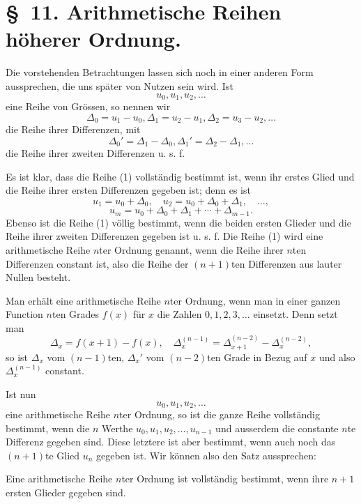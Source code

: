 \documentclass[11pt]{article}
\begin{document}
\section*{\S~11. Arithmetische Reihen höherer Ordnung.}

Die vorstehenden Betrachtungen lassen sich noch in einer anderen Form aussprechen, die uns später von Nutzen sein wird. Ist
\begin{equation}
 u_0,u_1,u_2,\ldots
\tag{1}
\end{equation}
eine Reihe von Grössen, so nennen wir
\begin{equation}
 \Delta_0=u_1-u_0,
 \Delta_1=u_2-u_1,
 \Delta_2=u_3-u_2,\ldots
\tag{2}
\end{equation}
die Reihe ihrer Differenzen, mit
\begin{equation}
 \Delta_0'=\Delta_1-\Delta_0,
 \Delta_1'=\Delta_2-\Delta_1,\ldots
\tag{3}
\end{equation}
die Reihe ihrer zweiten Differenzen u. s. f.

Es ist klar, dass die Reihe (1) vollständig bestimmt ist, wenn ihr erstes Glied und die Reihe ihrer ersten Differenzen gegeben ist; denn es ist
\[
 u_1=u_0+\Delta_0,
 \quad u_2=u_0+\Delta_0+\Delta_1,
 \quad\ldots,
\]
\[
 u_m=u_0+\Delta_0+\Delta_1+\cdots+\Delta_{m-1}.
\]
Ebenso ist die Reihe (1) völlig bestimmt, wenn die beiden ersten Glieder und die Reihe ihrer zweiten Differenzen gegeben ist u. s. f. Die Reihe (1) wird eine arithmetische Reihe $n$ter Ordnung genannt, wenn die Reihe ihrer $n$ten Differenzen constant ist, also die Reihe der $(n+1)$ten Differenzen aus lauter Nullen besteht.

Man erhält eine arithmetische Reihe $n$ter Ordnung, wenn man in einer ganzen Function $n$ten Grades $f(x)$ für $x$ die Zahlen $0,1,2,3,\ldots$ einsetzt. Denn setzt man
\[
 \Delta_x=f(x+1)-f(x),\quad
 \Delta_x^{(n-1)}=\Delta_{x+1}^{(n-2)}-\Delta_x^{(n-2)},
\]
so ist $\Delta_x$ vom $(n-1)$ten, $\Delta_x'$ vom $(n-2)$ten Grade in Bezug auf $x$ und also $\Delta_x^{(n-1)}$ constant.

Ist nun
\[
 u_0,u_1,u_2,\ldots
\]
eine arithmetische Reihe $n$ter Ordnung, so ist die ganze Reihe vollständig bestimmt, wenn die $n$ Werthe $u_0,u_1,u_2,\ldots,u_{n-1}$ und ausserdem die constante $n$te Differenz gegeben sind. Diese letztere ist aber bestimmt, wenn auch noch das $(n+1)$te Glied $u_n$ gegeben ist. Wir können also den Satz aussprechen:

Eine arithmetische Reihe $n$ter Ordnung ist vollständig bestimmt, wenn ihre $n+1$ ersten Glieder gegeben sind.
\end{document}
